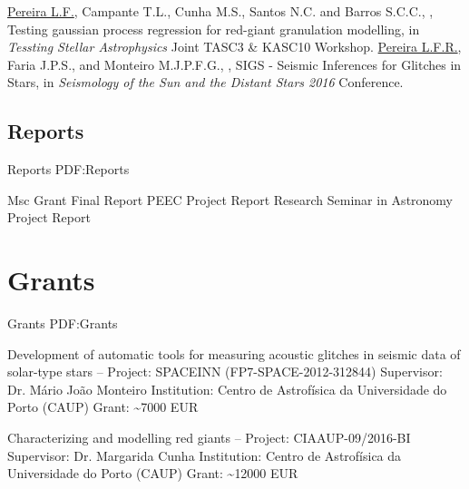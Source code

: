 \documentclass[letterpaper,10pt,oneside]{article}
\begin{document}
\begin{body}
{\underline{Pereira L.F.}, Campante T.L., Cunha M.S., Santos N.C. and Barros S.C.C., 
, 
Testing gaussian process regression for red-giant granulation modelling,
in \textit{Tessting Stellar Astrophysics} Joint TASC3 \& KASC10 Workshop.}
\GapNoBreak
{}
{\underline{Pereira L.F.R.}, Faria J.P.S., and Monteiro M.J.P.F.G., 
, 
SIGS - Seismic Inferences for Glitches in Stars,
in \textit{Seismology of the Sun and the Distant Stars 2016} Conference.}

\BigGap
\subsection
{Reports}
{Reports}
{PDF:Reports}

Msc Grant Final Report
PEEC Project Report
Research Seminar in Astronomy Project Report




\section
{Grants}
{Grants}
{PDF:Grants}

Development of automatic tools for measuring acoustic glitches in seismic data of solar-type stars
\hfill
{} --
\BulletItem
Project: SPACEINN (FP7-SPACE-2012-312844)
\BulletItem
Supervisor: Dr. Mário João Monteiro
\BulletItem
Institution: Centro de Astrofísica da Universidade do Porto (CAUP)
\BulletItem
Grant: \textasciitilde 7000 EUR


\BigGap
​Characterizing and modelling red giants
\hfill
{} --
\BulletItem
Project: ​CIAAUP-09/2016-BI
\BulletItem
Supervisor: Dr. Margarida Cunha
\BulletItem
Institution: Centro de Astrofísica da Universidade do Porto (CAUP)
\BulletItem
Grant: \textasciitilde 12000 EUR



\end{body}
\end{document}

